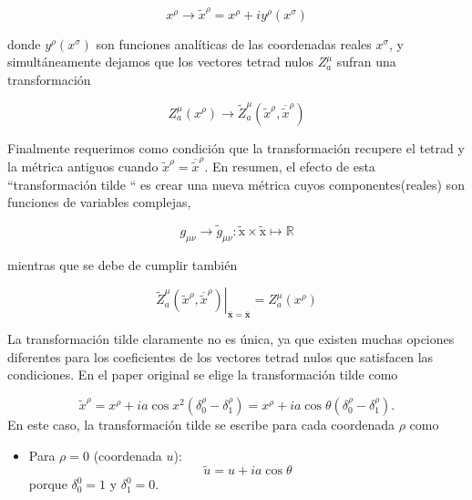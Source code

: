 \begin{enumerate}[1]
          \begin{equation}
              x^\rho \rightarrow \tilde{x}^\rho=x^\rho+i y^\rho\left(x^\sigma\right)
          \end{equation}

          donde $y^\rho\left(x^\sigma\right)$ son funciones analíticas de las coordenadas reales $x^\sigma$, y simultáneamente dejamos que los vectores tetrad nulos $Z_a^\mu$ sufran una transformación

          \begin{equation}
              Z_a^\mu\left(x^\rho\right) \rightarrow \tilde{Z}_a^\mu\left(\tilde{x}^\rho, \overline{\tilde{x}}^\rho\right)
          \end{equation}

          Finalmente requerimos como condición  que la transformación recupere el tetrad y la métrica antiguos cuando $\tilde{x}^\rho=\overline{\tilde{x}}^\rho$. En resumen, el efecto de esta ``transformación tilde `` es crear una nueva métrica cuyos componentes(reales) son  funciones de variables complejas,

          \begin{equation}
              g_{\mu \nu} \rightarrow \tilde{g}_{\mu \nu}: \tilde{\mathrm{x}} \times \tilde{\mathrm{x}} \mapsto \mathbb{R}
          \end{equation}

          mientras que se debe de cumplir también

          \begin{equation}
              \left.\tilde{Z}_a^\mu\left(\tilde{x}^\rho, \overline{\tilde{x}}^\rho\right)\right|_{\overline{\mathbf{x}}=\overline{\mathbf{x}}}=Z_a^\mu\left(x^\rho\right)
          \end{equation}

          La transformación tilde claramente no es única, ya que existen muchas opciones diferentes para los coeficientes de los vectores tetrad nulos que satisfacen las condiciones.
          En el paper original \cite{newman-1965} se elige la transformación tilde como

          \begin{equation}
              \tilde{x}^\rho=x^\rho+i a \cos x^2\left(\delta_0^\rho-\delta_1^\rho\right)= x^\rho+i a \cos \theta \left(\delta_0^\rho-\delta_1^\rho\right) .
          \end{equation}
          En este caso, la transformación tilde se  escribe para cada coordenada $\rho$ como
          \begin{itemize}
              \item Para $\rho=0$ (coordenada $u$):
                    \begin{equation}
                        \tilde{u}=u+i a \cos \theta
                    \end{equation}
                    porque $\delta_0^0=1$ y $\delta_1^0=0$.


\end{itemize}
\end{enumerate}
